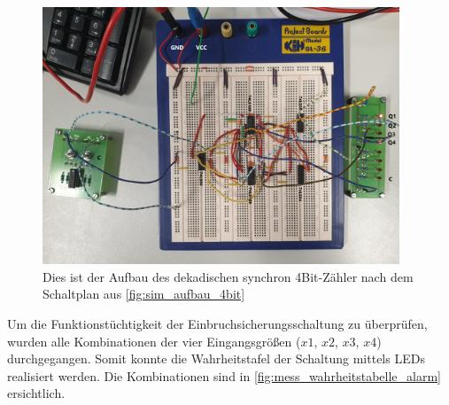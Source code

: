 \documentclass[12pt,english,ngerman]{scrartcl}
\begin{document}
\begin{figure}[H]
  \centering
    \includegraphics[width=0.95\textwidth]{./figures/messungen/4bit/aufbau.png}
  \caption{Dies ist der Aufbau des dekadischen synchron 4Bit-Zähler nach dem
  Schaltplan aus \autoref{fig:sim_aufbau_4bit}}
  \label{fig:mess_aufbau_4bit}
\end{figure}

Um die Funktionstüchtigkeit der Einbruchsicherungsschaltung zu überprüfen,
wurden alle Kombinationen der vier Eingangsgrößen ($x1$, $x2$, $x3$, $x4$)
durchgegangen. Somit konnte die Wahrheitstafel der Schaltung mittels LEDs realisiert werden.
Die Kombinationen sind in \autoref{fig:mess_wahrheitstabelle_alarm}
ersichtlich.
\end{document}
